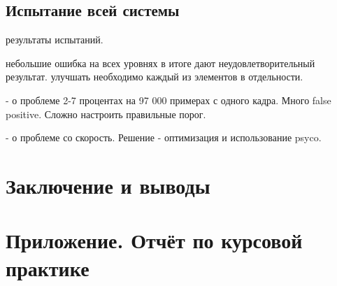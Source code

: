\documentclass[12pt]{report}
\begin{document}
\section{Испытание всей системы}
результаты испытаний.

небольшие ошибка на всех уровнях в итоге дают неудовлетворительный результат. улучшать необходимо каждый из элементов в отдельности.

- о проблеме 2-7 процентах на 97 000 примерах с одного кадра. Много false positive. Сложно настроить правильные порог.

- о проблеме со скорость. Решение - оптимизация и использование psyco.

\chapter*{Заключение и выводы}
\thispagestyle{fancy}


\appendix
\chapter{Приложение. Отчёт по курсовой практике}









\end{document}
